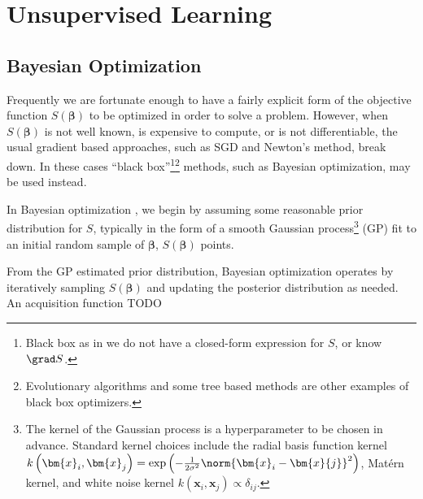 \section{Unsupervised Learning}
\label{additional:unsupervised}

\subsection{Bayesian Optimization}
\label{additional:unsupervised:BO}

Frequently we are fortunate enough to have a fairly explicit form of
the objective function $S\left(\bm{\beta}\right)$ to be optimized in order to solve a problem.
However, when $S\left(\bm{\beta}\right)$ is not well known, is expensive to compute, or is not differentiable,
the usual gradient based approaches, such as SGD and Newton's method, break down.
In these cases ``black box''\footnote{Black box as in
we do not have a closed-form expression for $S$, or know $\grad S$.}\footnote{Evolutionary algorithms and some tree based methods \cite{Hutter2011,Hutter2014}
are other examples of black box optimizers.} methods,
such as Bayesian optimization, may be used instead.

In Bayesian optimization \cite{Brochu2010,1301.1942,Borisyak},
we begin by assuming some reasonable prior distribution for $S$,
typically in the form of a smooth Gaussian process\footnote{The
kernel of the Gaussian process is a hyperparameter to be chosen in advance.
Standard kernel choices include
the radial basis function kernel $k\left(\bm{x}_{i}, \bm{x}_{j}\right) = \exp\left(-\frac{1}{2\sigma^{2}}\norm{\bm{x}_{i}-\bm{x}{j}}^{2}\right)$,
Mat\'{e}rn kernel,
and white noise kernel $k\left(\bm{x}_{i}, \bm{x}_{j}\right) \propto \delta_{ij}$.} (GP) fit
to an initial random sample of $\bm{\beta}$, $S\left(\bm{\beta}\right)$ points.

From the GP estimated prior distribution, Bayesian optimization
operates by iteratively sampling $S\left(\bm{\beta}\right)$ and updating the posterior distribution as needed.
An acquisition function TODO



